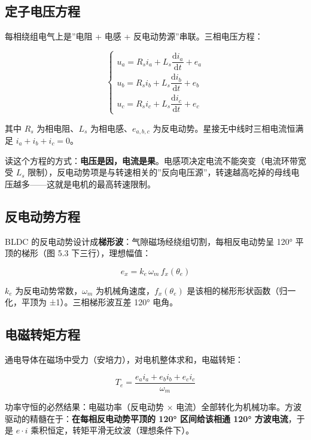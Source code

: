 \documentclass[
  UTF8,
  scheme=plain,
  fontsize=10pt,
  openany
]{ctexbook}
\begin{document}
\subsection{定子电压方程}\label{ux5b9aux5b50ux7535ux538bux65b9ux7a0b}

每相绕组电气上是''电阻 + 电感 + 反电动势源''串联。三相电压方程：

\[\begin{cases} u_a = R_s i_a + L_s \dfrac{\mathrm{d}i_a}{\mathrm{d}t} + e_a \\[4pt] u_b = R_s i_b + L_s \dfrac{\mathrm{d}i_b}{\mathrm{d}t} + e_b \\[4pt] u_c = R_s i_c + L_s \dfrac{\mathrm{d}i_c}{\mathrm{d}t} + e_c \end{cases}\]

其中 \(R_s\) 为相电阻、\(L_s\) 为相电感、\(e_{a,b,c}\)
为反电动势。星接无中线时三相电流恒满足 \(i_a + i_b + i_c = 0\)。

读这个方程的方式：\textbf{电压是因，电流是果}。电感项决定电流不能突变（电流环带宽受
\(L_s\)
限制），反电动势项是与转速相关的''反向电压源''，转速越高吃掉的母线电压越多------这就是电机的最高转速限制。

\subsection{反电动势方程}\label{ux53cdux7535ux52a8ux52bfux65b9ux7a0b}

BLDC 的反电动势设计成\textbf{梯形波}：气隙磁场经绕组切割，每相反电动势呈
120° 平顶的梯形（图 5.3 下三行），理想幅值：

\[e_x = k_e \, \omega_m \, f_x(\theta_e)\]

\(k_e\) 为反电动势常数，\(\omega_m\) 为机械角速度，\(f_x(\theta_e)\)
是该相的梯形形状函数（归一化，平顶为 ±1）。三相梯形波互差 120° 电角。

\subsection{电磁转矩方程}\label{ux7535ux78c1ux8f6cux77e9ux65b9ux7a0b}

通电导体在磁场中受力（安培力），对电机整体求和，电磁转矩：

\[T_e = \frac{e_a i_a + e_b i_b + e_c i_c}{\omega_m}\]

功率守恒的必然结果：电磁功率（反电动势 ×
电流）全部转化为机械功率。方波驱动的精髓在于：\textbf{在每相反电动势平顶的
120° 区间给该相通 120° 方波电流}，于是 \(e \cdot i\)
乘积恒定，转矩平滑无纹波（理想条件下）。
\end{document}
